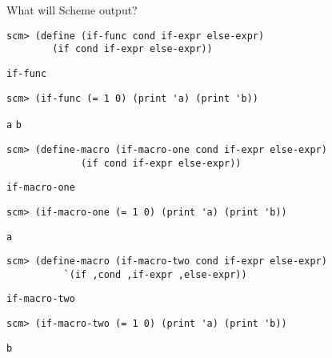 \begin{blocksection}

\question What will Scheme output?


\begin{lstlisting}
scm> (define (if-func cond if-expr else-expr)
		(if cond if-expr else-expr))
\end{lstlisting}
\begin{solution}[.25in]
\texttt{if-func}
\end{solution}

\begin{lstlisting}
scm> (if-func (= 1 0) (print 'a) (print 'b))
\end{lstlisting}
\begin{solution}[.25in]
\texttt{a}
\newline
\texttt{b}
\end{solution}

\end{blocksection}
\begin{blocksection}

\begin{lstlisting}
scm> (define-macro (if-macro-one cond if-expr else-expr)
             (if cond if-expr else-expr))
\end{lstlisting}
\begin{solution}[.25in]
\texttt{if-macro-one}
\end{solution}

\begin{lstlisting}
scm> (if-macro-one (= 1 0) (print 'a) (print 'b))
\end{lstlisting}
\begin{solution}[.25in]
\texttt{a}
\end{solution}

\begin{lstlisting}
scm> (define-macro (if-macro-two cond if-expr else-expr)
          `(if ,cond ,if-expr ,else-expr))
\end{lstlisting}
\begin{solution}[.25in]
\texttt{if-macro-two}
\end{solution}

\begin{lstlisting}
scm> (if-macro-two (= 1 0) (print 'a) (print 'b))
\end{lstlisting}
\begin{solution}[.25in]
\texttt{b}
\end{solution}
\end{blocksection}
